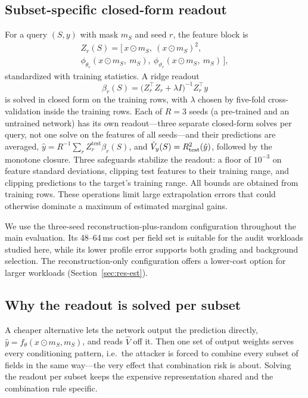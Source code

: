 \subsection{Subset-specific closed-form readout}
For a query $(S,y)$ with mask $m_S$ and seed $r$, the feature block is
\begin{multline}
Z_{r}(S) = \big[\, x\odot m_S,\ (x \odot m_S)^{2},\\ \phi_{\theta_r}(x\odot m_S,\ m_S),\ \phi_{\vartheta_r}(x\odot m_S,\ m_S) \,\big],
\end{multline}
standardized with training statistics. A ridge readout
\begin{equation}\label{eq:ridge}
\beta_{r}(S) = \big(Z_r^{\top} Z_r + \lambda I\big)^{-1} Z_r^{\top} y
\end{equation}
is solved in closed form on the training rows, with $\lambda$ chosen by five-fold
cross-validation inside the training rows. Each of $R=3$ seeds (a pre-trained and an untrained network) has its own
readout---three separate closed-form solves per query, not one solve on the features of all seeds---and their
predictions are averaged, $\hat y = R^{-1}\sum_r Z_r^{\mathrm{test}}\beta_r(S)$, and
$\hat V_y(S)=R^2_{\mathrm{test}}(\hat y)$, followed by the monotone closure. Three safeguards stabilize the readout: a floor of $10^{-3}$ on feature standard deviations, clipping test features to their training range, and clipping predictions to the target's training range. All bounds are obtained from training rows. These operations limit large extrapolation errors that could otherwise dominate a maximum of estimated marginal gains.

We use the three-seed reconstruction-plus-random configuration throughout the main evaluation. Its 48--64\,ms cost per field set is suitable for the audit workloads studied here, while its lower profile error supports both grading and background selection. The reconstruction-only configuration offers a lower-cost option for larger workloads (Section~\ref{sec:res-est}).

\subsection{Why the readout is solved per subset}
A cheaper alternative lets the network output the prediction directly, $\hat y=f_\theta(x\odot
m_S, m_S)$, and reads $\hat V$ off it. Then one set of output weights serves every
conditioning pattern, i.e.\ the attacker is forced to combine every subset of fields in the
same way---the very effect that combination risk is about. Solving the readout per subset
keeps the expensive representation shared and the combination rule specific.

